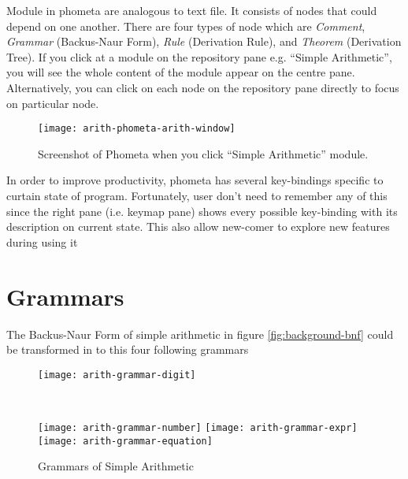 \documentclass[master.tex]{subfiles}
\begin{document}
Module in phometa are analogous to text file. It consists of nodes that could
depend on one another. There are four types of node which are \emph{Comment},
\emph{Grammar} (Backus-Naur Form), \emph{Rule} (Derivation Rule), and
\emph{Theorem} (Derivation Tree). If you click at a module on the repository
pane e.g. ``Simple Arithmetic'', you will see the whole content of the module
appear on the centre pane. Alternatively, you can click on each node on the
repository pane directly to focus on particular node.

\begin{figure}[H]
    \centering
    \texttt{[image: arith-phometa-arith-window]}
    \caption{Screenshot of Phometa when you click ``Simple Arithmetic'' module.}
\label{fig:arith-phometa-arith-window}
\end{figure}

In order to improve productivity, phometa has several key-bindings specific to
curtain state of program. Fortunately, user don't need to remember any of this
since the right pane (i.e. keymap pane) shows every possible key-binding with
its description on current state. This also allow new-comer to explore new
features during using it

\section{Grammars}

The Backus-Naur Form of simple arithmetic in figure \ref{fig:background-bnf}
could be transformed in to this four following grammars
\begin{figure}[H]
    \centering
\begin{minipage}{0.48\textwidth}
\begin{flushleft}
    \texttt{[image: arith-grammar-digit]}
\end{flushleft}
\end{minipage}
~
\begin{minipage}{0.48\textwidth}
\begin{flushright}
    \texttt{[image: arith-grammar-number]}
    \texttt{[image: arith-grammar-expr]}
    \texttt{[image: arith-grammar-equation]}
\end{flushright}
\end{minipage}
    \caption{Grammars of Simple Arithmetic}
\label{fig:arith-grammars}
\end{figure}
\end{document}
